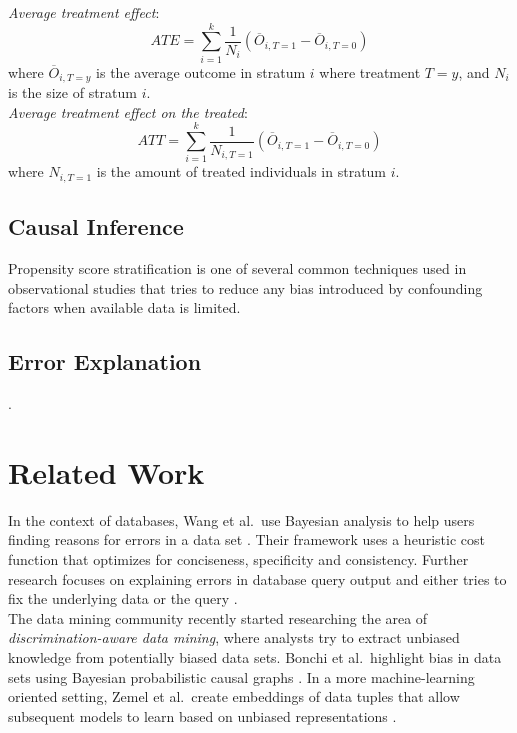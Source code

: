 \documentclass[acmsmall, nonacm, screen]{acmart} %
\begin{document}
\textit{Average treatment effect}:
\begin{equation}
ATE = \sum_{i=1}^{k}{\frac{1}{N_i}(\overline{O}_{i, T = 1} - \overline{O}_{i, T = 0})}
\end{equation}
where $\overline{O}_{i, T = y}$ is the average outcome in stratum $i$ where treatment $T = y$, and $N_i$ is the size of stratum $i$.\\

\textit{Average treatment effect on the treated}:
\begin{equation}
ATT = \sum_{i=1}^{k}{\frac{1}{N_{i, T = 1}}(\overline{O}_{i,T = 1} - \overline{O}_{i,T = 0})}
\end{equation}
where $N_{i, T = 1}$ is the amount of treated individuals in stratum $i$.

\subsection{Causal Inference}

Propensity score stratification \cite{Austin11} is one of several common techniques used in observational studies that tries to reduce any bias introduced by confounding factors when available data is limited.\\

\subsection{Error Explanation}

.\\


\section{Related Work}
In the context of databases, Wang et al.\ use Bayesian analysis to help users finding reasons for errors in a data set \cite{Wang15}. 
Their framework uses a heuristic cost function that optimizes for conciseness, specificity and consistency. Further research focuses on explaining errors in database query output and either tries to fix the underlying data \cite{Wu13} or the query \cite{Tran10}.\\

The data mining community recently started researching the area of \textit{discrimination-aware data mining}, where analysts try to extract unbiased knowledge from potentially biased data sets. Bonchi et al.\ highlight bias in data sets using Bayesian probabilistic causal graphs \cite{Bonchi2017}. In a more machine-learning oriented setting, Zemel et al.\ create embeddings of data tuples that allow subsequent models to learn based on unbiased representations \cite{Zemel13}.\\
\end{document}
